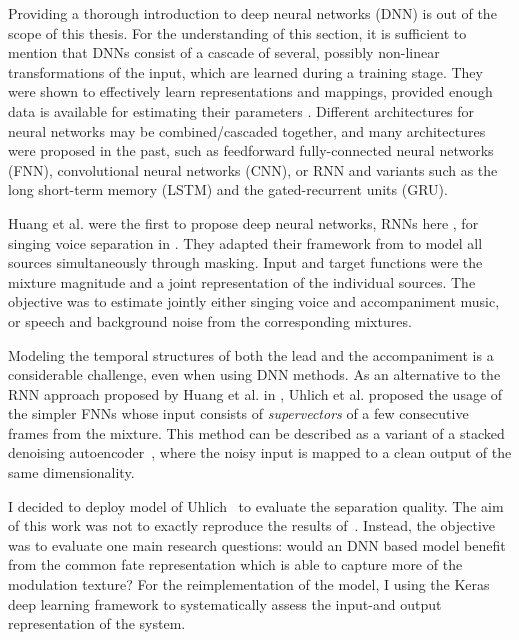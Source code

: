 {{%
Providing a thorough introduction to deep neural networks (DNN) is out of the scope of this thesis.
For the understanding of this section, it is sufficient to mention that DNNs consist of a cascade of several, possibly non-linear transformations of the input, which are learned during a training stage.
They were shown to effectively learn representations and mappings, provided enough data is available for estimating their parameters \cite{deng14, lecun15, goodfellow16}.
Different architectures for neural networks may be combined/cascaded together, and many architectures were proposed in the past, such as feedforward fully-connected neural networks (FNN), convolutional neural networks (CNN), or RNN and variants such as the long short-term memory (LSTM) and the gated-recurrent units (GRU).
\par
Huang et al. were the first to propose deep neural networks, RNNs here \cite{hermans13,pascanu14}, for singing voice separation in \cite{huang14,huang15}. They adapted their framework from \cite{huang142} to model all sources simultaneously through masking. Input and target functions were the mixture magnitude and a joint representation of the individual sources. The objective was to estimate jointly either singing voice and accompaniment music, or speech and background noise from the corresponding mixtures.
\par
Modeling the temporal structures of both the lead and the accompaniment is a considerable challenge, even when using DNN methods. As an alternative to the RNN approach proposed by Huang et al. in \cite{huang14}, Uhlich et al. proposed the usage of the simpler FNNs \cite{uhlich15} whose input consists of \textit{supervectors} of a few consecutive frames from the mixture.
This method can be described as a variant of a stacked denoising autoencoder~\cite{pvincent08}, where the noisy input is mapped to a clean output of the same dimensionality.
\par
I decided to deploy model of Uhlich~\cite{uhlich15} to evaluate the separation quality.
The aim of this work was not to exactly reproduce the results of~\cite{uhlich15}.
Instead, the objective was to evaluate one main research questions: would an DNN based model benefit from the common fate representation which is able to capture more of the modulation texture?
For the reimplementation of the model, I using the Keras~\cite{chollet15} deep learning framework to systematically assess the input-and output representation of the system.

}}
